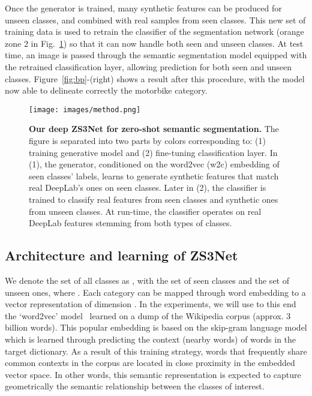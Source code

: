 \documentclass{article}
\begin{document}
Once the generator is trained, many synthetic features can be produced for unseen classes, and combined with real samples from seen classes.
This new set of training data is used to retrain the classifier of the segmentation network (orange zone 2 in Fig.~\ref{method}) so that it can now handle both seen and unseen classes.
At test time, an image is passed through the semantic segmentation model equipped with the retrained classification layer, allowing prediction for both seen and unseen classes. Figure~\ref{fig:bp}-(right) shows a result after this procedure, with the model now able to delineate correctly the motorbike category. 

\begin{figure}[t]
\centering
\texttt{[image: images/method.png]}
\caption{\small \textbf{Our deep ZS3Net for zero-shot semantic segmentation.}
The figure is separated into two parts by colors corresponding to: \textcolor{FIGBLUE}{(1)} training generative model and \textcolor{FIGORANGE}{(2)} fine-tuning classification layer.
In \textcolor{FIGBLUE}{(1)}, the generator, conditioned on the word2vec (\textcolor{FIGGREEN}{w2c}) embedding of seen classes' labels, learns to generate synthetic features that match real DeepLab's ones on seen classes.
Later in \textcolor{FIGORANGE}{(2)}, the classifier is trained to classify real features from seen classes and synthetic ones from unseen classes.
At run-time, the classifier operates on real DeepLab features stemming from both types of classes.}
\vspace{-0.5cm}
\label{method}
\end{figure}

\subsection{Architecture and learning of ZS3Net}\label{sec:arch_design}

We denote the set of all classes as , with  the set of seen classes and  the set of unseen ones, where . Each category  can be mapped through word embedding to a vector representation  of dimension . In the experiments, we will use to this end the `word2vec' model~\cite{mikolov2013distributed} learned on a dump of the Wikipedia corpus (approx. 3 billion words). This popular embedding is based on the skip-gram language model which is learned through predicting the context (nearby words) of words in the target dictionary. As a result of this training strategy, words that frequently share common contexts in the corpus are located in close proximity in the embedded vector space. In other words, this semantic representation is expected to capture geometrically the semantic relationship between the classes of interest.
\end{document}
